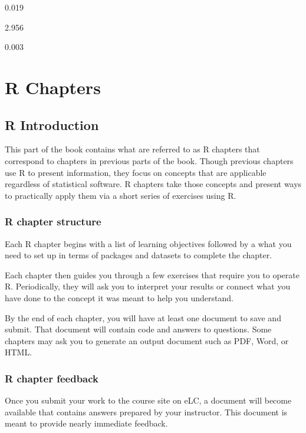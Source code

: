 \documentclass[
]{book}
\begin{document}
0.019

2.956

0.003

\hypertarget{part-r-chapters}{%
\part{R Chapters}\label{part-r-chapters}}

\hypertarget{r-introduction}{%
\chapter{R Introduction}\label{r-introduction}}

This part of the book contains what are referred to as R chapters that correspond to chapters in previous parts of the book. Though previous chapters use R to present information, they focus on concepts that are applicable regardless of statistical software. R chapters take those concepts and present ways to practically apply them via a short series of exercises using R.

\hypertarget{r-chapter-structure}{%
\section{R chapter structure}\label{r-chapter-structure}}

Each R chapter begins with a list of learning objectives followed by a what you need to set up in terms of packages and datasets to complete the chapter.

Each chapter then guides you through a few exercises that require you to operate R. Periodically, they will ask you to interpret your results or connect what you have done to the concept it was meant to help you understand.

By the end of each chapter, you will have at least one document to save and submit. That document will contain code and answers to questions. Some chapters may ask you to generate an output document such as PDF, Word, or HTML.

\hypertarget{r-chapter-feedback}{%
\section{R chapter feedback}\label{r-chapter-feedback}}

Once you submit your work to the course site on eLC, a document will become available that contains answers prepared by your instructor. This document is meant to provide nearly immediate feedback.
\end{document}

